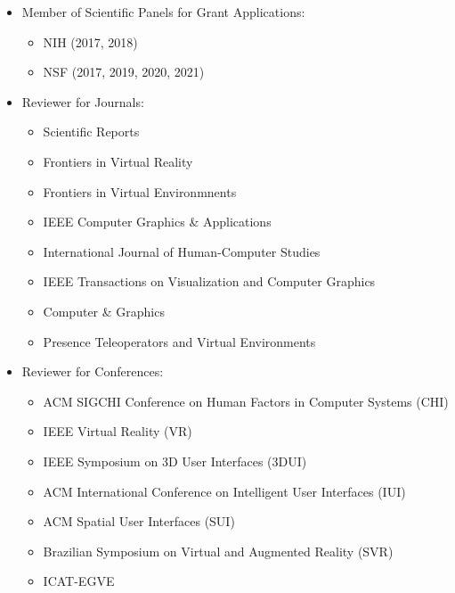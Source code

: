 \documentclass[wideaddress]{vitae}
\let\olditem\item
\def\item{\nopagebreak[4]\olditem}%
\begin{document}
\begin{itemize}
	\item Member of Scientific Panels for Grant Applications:
		\begin{itemize}
			\item{NIH (2017, 2018)}
			\item{NSF (2017, 2019, 2020, 2021)}
		\end{itemize}
	\item Reviewer for Journals:
		\begin{itemize}
			\item{Scientific Reports}
			\item{Frontiers in Virtual Reality}
			\item{Frontiers in Virtual Environmnents}
			\item{IEEE Computer Graphics \& Applications}
			\item{International Journal of Human-Computer Studies}
			\item{IEEE Transactions on Visualization and Computer Graphics}
			\item{Computer \& Graphics}
			\item{Presence Teleoperators and Virtual Environments}
		\end{itemize}
	\item Reviewer for Conferences:
		\begin{itemize}
			\item{ACM SIGCHI Conference on Human Factors in Computer Systems (CHI)}
			\item{IEEE Virtual Reality (VR)}
			\item{IEEE Symposium on 3D User Interfaces (3DUI)}
			\item{ACM International Conference on Intelligent User Interfaces (IUI)}
			\item{ACM Spatial User Interfaces (SUI)}
			\item{Brazilian Symposium on Virtual and Augmented Reality (SVR)}
			\item{ICAT-EGVE}
		\end{itemize}
\end{itemize}
\end{document}
